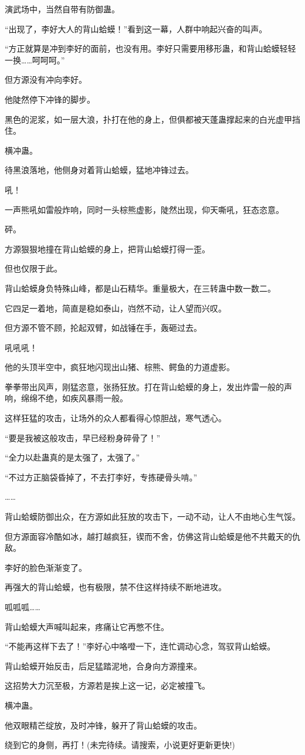 \begin{this_body}
演武场中，当然自带有防御蛊。

“出现了，李好大人的背山蛤蟆！”看到这一幕，人群中响起兴奋的叫声。

“方正就算是冲到李好的面前，也没有用。李好只需要用移形蛊，和背山蛤蟆轻轻一换……呵呵呵。”

但方源没有冲向李好。

他陡然停下冲锋的脚步。

黑色的泥浆，如一层大浪，扑打在他的身上，但俱都被天蓬蛊撑起来的白光虚甲挡住。

横冲蛊。

待黑浪落地，他侧身对着背山蛤蟆，猛地冲锋过去。

吼！

一声熊吼如雷般炸响，同时一头棕熊虚影，陡然出现，仰天嘶吼，狂态恣意。

砰。

方源狠狠地撞在背山蛤蟆的身上，把背山蛤蟆打得一歪。

但也仅限于此。

背山蛤蟆身负特殊山峰，都是山石精华。重量极大，在三转蛊中数一数二。

它四足一着地，简直是稳如泰山，岿然不动，让人望而兴叹。

但方源不管不顾，抡起双臂，如战锤在手，轰砸过去。

吼吼吼！

他的头顶半空中，疯狂地闪现出山猪、棕熊、鳄鱼的力道虚影。

拳拳带出风声，刚猛恣意，张扬狂放。打在背山蛤蟆的身上，发出炸雷一般的声响，绵绵不绝，如疾风暴雨一般。

这样狂猛的攻击，让场外的众人都看得心惊胆战，寒气透心。

“要是我被这般攻击，早已经粉身碎骨了！”

“全力以赴蛊真的是太强了，太强了。”

“不过方正脑袋昏掉了，不去打李好，专拣硬骨头啃。”

……

背山蛤蟆防御出众，在方源如此狂放的攻击下，一动不动，让人不由地心生气馁。

但方源面容冷酷如冰，越打越疯狂，锲而不舍，仿佛这背山蛤蟆是他不共戴天的仇敌。

李好的脸色渐渐变了。

再强大的背山蛤蟆，也有极限，禁不住这样持续不断地进攻。

呱呱呱……

背山蛤蟆大声喊叫起来，疼痛让它再憋不住。

“不能再这样下去了！”李好心中咯噔一下，连忙调动心念，驾驭背山蛤蟆。

背山蛤蟆开始反击，后足猛踏泥地，合身向方源撞来。

这招势大力沉至极，方源若是挨上这一记，必定被撞飞。

横冲蛊。

他双眼精芒绽放，及时冲锋，躲开了背山蛤蟆的攻击。

绕到它的身侧，再打！(未完待续。请搜索，小说更好更新更快!)

\end{this_body}

